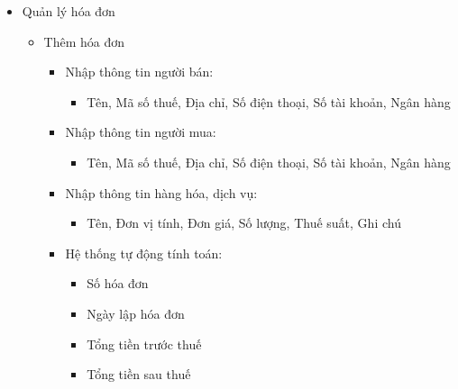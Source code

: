 \begin{itemize}
\begin{itemize}
\end{itemize}

\item Quản lý hóa đơn

\begin{itemize}

\item Thêm hóa đơn

\begin{itemize}

\item Nhập thông tin người bán:

\begin{itemize}

\item Tên, Mã số thuế, Địa chỉ, Số điện thoại, Số tài khoản, Ngân hàng

\end{itemize}

\item Nhập thông tin người mua:

\begin{itemize}

\item Tên, Mã số thuế, Địa chỉ, Số điện thoại, Số tài khoản, Ngân hàng

\end{itemize}

\item Nhập thông tin hàng hóa, dịch vụ:

\begin{itemize}

\item Tên, Đơn vị tính, Đơn giá, Số lượng, Thuế suất, Ghi chú

\end{itemize}

\item Hệ thống tự động tính toán:

\begin{itemize}

\item Số hóa đơn

\item Ngày lập hóa đơn

\item Tổng tiền trước thuế

\item Tổng tiền sau thuế

\end{itemize}

\end{itemize}


\end{itemize}
\end{itemize}
